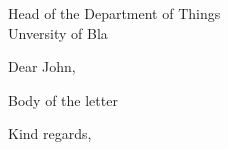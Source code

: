\documentclass[a4paper]{letter}
\newcommand{\recipient}{%
    Head of the Department of Things \\
    Unversity of Bla
}
\begin{document}
\begin{letter}{\recipient}

\opening{Dear John,}

Body of the letter

\closing{Kind regards,}

\end{letter}
\end{document}
